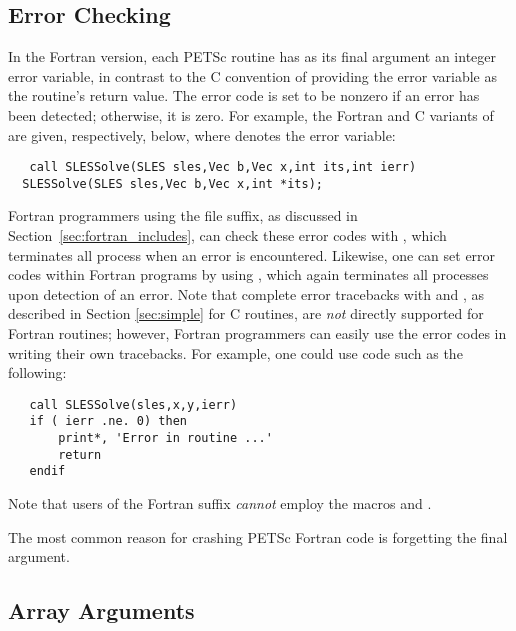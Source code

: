 \subsection{Error Checking}
\label{sec:fortran_errors}

In the Fortran version, each PETSc routine has as its final argument
an integer error variable, in contrast to the C convention of
providing the error variable as the routine's return value.  The error
code is set to be nonzero if an error has been detected; otherwise, it
is zero.  For example, the Fortran and C variants of  are
given, respectively, below, where  denotes the error variable:
\begin{verbatim}
   call SLESSolve(SLES sles,Vec b,Vec x,int its,int ierr)
  SLESSolve(SLES sles,Vec b,Vec x,int *its);
\end{verbatim}

Fortran programmers using the  file suffix, as discussed in
Section~\ref{sec:fortran_includes}, can check these error codes with
, which terminates all process when an error is
encountered.  Likewise, one can set error codes within Fortran programs by
using , which again terminates all processes
upon detection of an error.  
Note that complete error tracebacks with
 and , as described in Section
\ref{sec:simple} for C routines, are {\em not} directly supported for
Fortran routines; however, Fortran programmers can easily use the
error codes in writing their own tracebacks.  For example, one could
use code such as the following:
\begin{verbatim}
   call SLESSolve(sles,x,y,ierr)
   if ( ierr .ne. 0) then
       print*, 'Error in routine ...'
       return
   endif
\end{verbatim}
Note that users of the Fortran  suffix {\em cannot} employ the
macros  and .

The most common reason for crashing PETSc Fortran code is forgetting the 
final  argument.

\subsection{Array Arguments}
\label{sec:fortranarrays}

